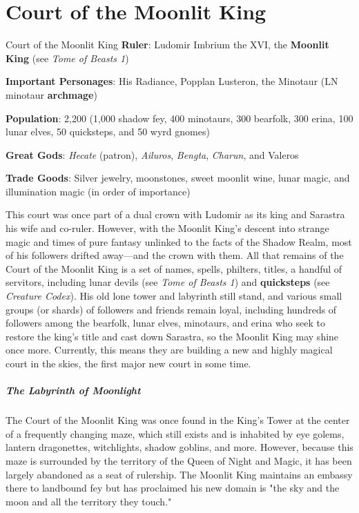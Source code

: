 \documentclass[10pt,a4paper,twoside,bg=print,twocolumn,openany,nodeprecatedcode]{dndbook}
\begin{document}
\section{Court of the Moonlit King}
\begin{DndSidebar}[float=!b]{Court of the Moonlit King}
\textbf{Ruler}: Ludomir Imbrium the XVI, the \textbf{Moonlit King} (see \textit{Tome of Beasts 1})



\textbf{Important Personages}: His Radiance, Popplan Lusteron, the Minotaur (LN minotaur \textbf{archmage})



\textbf{Population}: 2,200 (1,000 shadow fey, 400 minotaurs, 300 bearfolk, 300 erina, 100 lunar elves, 50 quicksteps, and 50 wyrd gnomes)



\textbf{Great Gods}: \textit{Hecate} (patron), \textit{Ailuros}, \textit{Bengta}, \textit{Charun}, and Valeros



\textbf{Trade Goods}: Silver jewelry, moonstones, sweet moonlit wine, lunar magic, and illumination magic (in order of importance)





\end{DndSidebar}

This court was once part of a dual crown with Ludomir as its king and Sarastra his wife and co-ruler. However, with the Moonlit King's descent into strange magic and times of pure fantasy unlinked to the facts of the Shadow Realm, most of his followers drifted away—and the crown with them. All that remains of the Court of the Moonlit King is a set of names, spells, philters, titles, a handful of servitors, including lunar devils (see \textit{Tome of Beasts 1}) and \textbf{quicksteps} (see \textit{Creature Codex}). His old lone tower and labyrinth still stand, and various small groups (or shards) of followers and friends remain loyal, including hundreds of followers among the bearfolk, lunar elves, minotaurs, and erina who seek to restore the king's title and cast down Sarastra, so the Moonlit King may shine once more. Currently, this means they are building a new and highly magical court in the skies, the first major new court in some time.

\subparagraph{The Labyrinth of Moonlight}
The Court of the Moonlit King was once found in the King's Tower at the center of a frequently changing maze, which still exists and is inhabited by eye golems, lantern dragonettes, witchlights, shadow goblins, and more. However, because this maze is surrounded by the territory of the Queen of Night and Magic, it has been largely abandoned as a seat of rulership. The Moonlit King maintains an embassy there to landbound fey but has proclaimed his new domain is "the sky and the moon and all the territory they touch."
\end{document}
